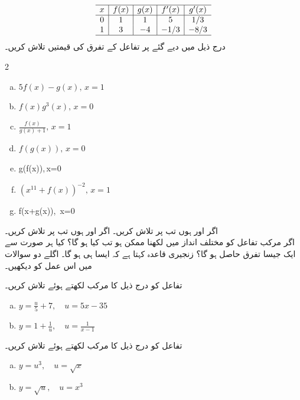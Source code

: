 \begin{align*}
\begin{array}{c|c|c|c|c}
\hline
x&f(x)&g(x)&f'(x)&g'(x)\\
\hline
0&1&1&5&1/3\\
1&3&-4&-1/3&-8/3\\
\hline
\end{array}
\end{align*}
درج ذیل میں دیے گئے  پر  تفاعل کے تفرق کی قیمتیں  تلاش کریں۔
\begin{multicols}{2}
\begin{enumerate}[a.]

\item
$5f(x)-g(x),\, x=1$
\item
$f(x)g^3(x),\,x=0$
\item
$\tfrac{f(x)}{g(x)+1},\, x=1$
\item
$f(g(x)),\, x=0$
\item
g(f(x)),\,x=0
\item
$(x^{11}+f(x))^{-2},\, x=1$
\item
f(x+g(x)),\, x=0
\end{enumerate}
\end{multicols}

اگر  اور  ہوں تب  پر  تلاش کریں۔
اگر  اور  ہوں تب  پر  تلاش کریں۔
\\
اگر مرکب تفاعل کو مختلف انداز میں لکھنا ممکن ہو تب کیا ہو گا؟  کیا ہر صورت سے ایک جیسا تفرق حاصل ہو گا؟ زنجیری قاعدہ کہتا ہے کہ ایسا ہی ہو گا۔ اگلے دو سوالات میں اس عمل کو دیکھیں۔

تفاعل   کو درج ذیل کا مرکب لکھتے ہوئے   تلاش کریں۔\\
\begin{enumerate}[a.]

\item
$y=\tfrac{u}{5}+7,\quad u=5x-35$
\item
$y=1+\tfrac{1}{u},\quad u=\tfrac{1}{x-1}$

\end{enumerate}
تفاعل   کو درج ذیل کا مرکب لکھتے ہوئے   تلاش کریں۔\\
\begin{enumerate}[a.]

\item
$y=u^3,\quad u=\sqrt{x}$
\item
$y=\sqrt{u},\quad u=x^3$

\end{enumerate}

